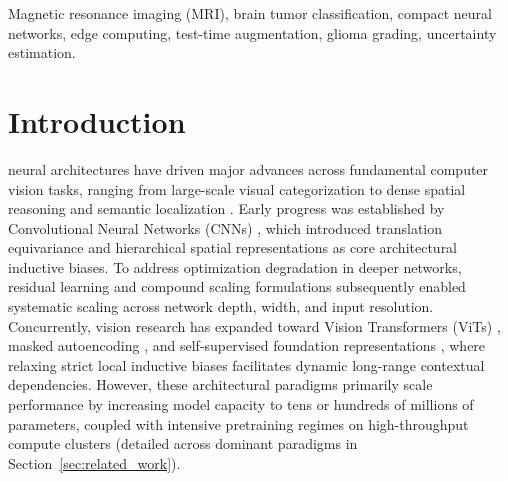 \documentclass[journal]{IEEEtran}
\begin{document}
\begin{IEEEkeywords}
Magnetic resonance imaging (MRI), brain tumor classification, compact neural networks, edge computing, test-time augmentation, glioma grading, uncertainty estimation.
\end{IEEEkeywords}



\IEEEpeerreviewmaketitle


\section{Introduction}
 neural architectures have driven major advances across fundamental computer vision tasks, ranging from large-scale visual categorization \cite{8, 19} to dense spatial reasoning and semantic localization \cite{10, 37}. Early progress was established by Convolutional Neural Networks (CNNs) \cite{15, 18}, which introduced translation equivariance and hierarchical spatial representations as core architectural inductive biases. To address optimization degradation in deeper networks, residual learning \cite{10} and compound scaling formulations \cite{30} subsequently enabled systematic scaling across network depth, width, and input resolution. Concurrently, vision research has expanded toward Vision Transformers (ViTs) \cite{6, 33}, masked autoencoding \cite{34}, and self-supervised foundation representations \cite{1}, where relaxing strict local inductive biases facilitates dynamic long-range contextual dependencies. However, these architectural paradigms primarily scale performance by increasing model capacity to tens or hundreds of millions of parameters, coupled with intensive pretraining regimes on high-throughput compute clusters \cite{8, 32} (detailed across dominant paradigms in Section~\ref{sec:related_work}).
\end{document}
